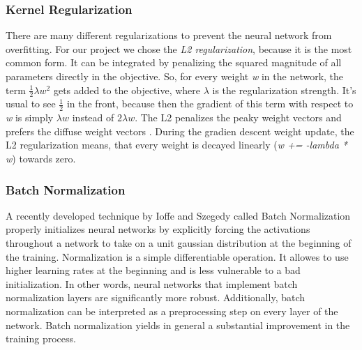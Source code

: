 \documentclass[journal]{IEEEtran}
\begin{document}
\subsubsection{Kernel Regularization}
\noindent There are many different regularizations to prevent the neural network from overfitting. For our project we chose the \textit{L2 regularization}, because it is the most common form.
It can be integrated by penalizing the squared magnitude of all parameters directly in the objective. So, for every weight \textit{w} in the network, the term \(\frac{1}{2} \lambda w^2\) gets added to the objective, where \(\lambda \) is the regularization strength. It's usual to see \(\frac{1}{2}\) in the front, because then the gradient of this term with respect to \textit{w} is simply \(\lambda w\) instead of \(2 \lambda w\). The L2 penalizes the peaky weight vectors and prefers the diffuse weight vectors \cite{RN4}. During the gradien descent weight update, the L2 regularization means, that every weight is decayed linearly (\textit{w += -lambda * w}) towards zero. \\
\subsubsection{Batch Normalization}
\noindent A recently developed technique by Ioffe and Szegedy \cite{RN4} called Batch Normalization  properly initializes neural networks by explicitly forcing the activations throughout a network to take on a unit gaussian distribution at the beginning of the training. Normalization is a simple differentiable operation. 
It allowes to use higher learning rates at the beginning and is less vulnerable to a bad initialization. In other words, neural networks that implement batch normalization layers are significantly more robust. Additionally, batch normalization can be interpreted as a preprocessing step on every layer of the network. Batch normalization yields in general a substantial improvement in the training process. \\
\end{document}
